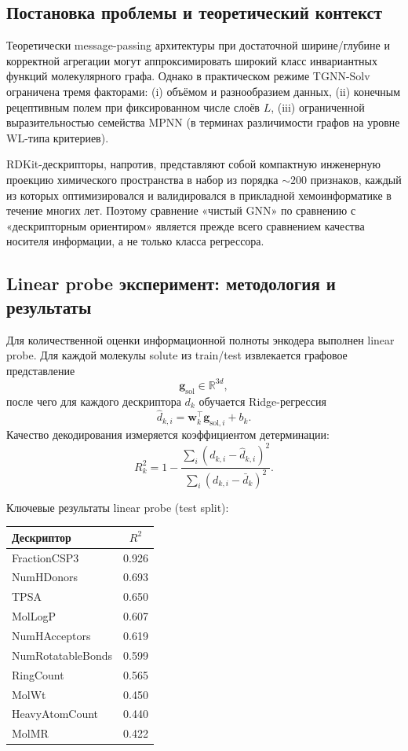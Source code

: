 \documentclass[11pt]{article}
\begin{document}
\subsection{Постановка проблемы и теоретический контекст}

Теоретически message-passing архитектуры при достаточной ширине/глубине и корректной агрегации могут аппроксимировать широкий класс инвариантных функций молекулярного графа. Однако в практическом режиме TGNN-Solv ограничена тремя факторами: (i) объёмом и разнообразием данных, (ii) конечным рецептивным полем при фиксированном числе слоёв $L$, (iii) ограниченной выразительностью семейства MPNN (в терминах различимости графов на уровне WL-типа критериев).

RDKit-дескрипторы, напротив, представляют собой компактную инженерную проекцию химического пространства в набор из порядка $\sim 200$ признаков, каждый из которых оптимизировался и валидировался в прикладной хемоинформатике в течение многих лет. Поэтому сравнение «чистый GNN» по сравнению с «дескрипторным ориентиром» является прежде всего сравнением качества носителя информации, а не только класса регрессора.

\subsection{Linear probe эксперимент: методология и результаты}

Для количественной оценки информационной полноты энкодера выполнен linear probe.
Для каждой молекулы solute из train/test извлекается графовое представление
\begin{equation*}
\mathbf{g}_{\mathrm{sol}}\in\mathbb{R}^{3d},
\end{equation*}
после чего для каждого дескриптора $d_k$ обучается Ridge-регрессия
\begin{equation*}
\hat d_{k,i}=\mathbf{w}_k^\top\mathbf{g}_{\mathrm{sol},i}+b_k.
\end{equation*}
Качество декодирования измеряется коэффициентом детерминации:
\begin{equation*}
R^2_k = 1 - \frac{\sum_i (d_{k,i} - \hat{d}_{k,i})^2}{\sum_i (d_{k,i} - \bar{d}_k)^2}.
\end{equation*}

Ключевые результаты linear probe (test split):
\begin{center}
\small
\begin{tabular}{l c}
\hline
Дескриптор & $R^2$ \\
\hline
FractionCSP3 & 0.926 \\
NumHDonors & 0.693 \\
TPSA & 0.650 \\
MolLogP & 0.607 \\
NumHAcceptors & 0.619 \\
NumRotatableBonds & 0.599 \\
RingCount & 0.565 \\
MolWt & 0.450 \\
HeavyAtomCount & 0.440 \\
MolMR & 0.422 \\
\hline
\end{tabular}
\normalsize
\end{center}
\end{document}
